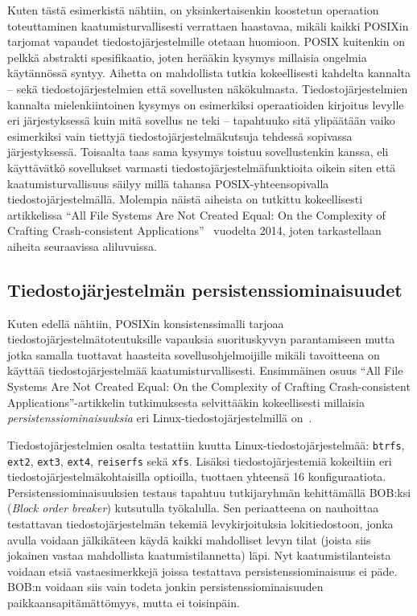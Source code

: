 Kuten tästä esimerkistä nähtiin, on yksinkertaisenkin koostetun operaation toteuttaminen kaatumisturvallisesti verrattaen haastavaa,
mikäli kaikki POSIXin tarjomat vapaudet tiedostojärjestelmille otetaan huomioon.
POSIX kuitenkin on pelkkä abstrakti spesifikaatio, joten herääkin kysymys millaisia ongelmia käytännössä syntyy.
Aihetta on mahdollista tutkia kokeellisesti kahdelta kannalta -- sekä tiedostojärjestelmien että sovellusten näkökulmasta.
Tiedostojärjestelmien kannalta mielenkiintoinen kysymys on esimerkiksi operaatioiden kirjoitus levylle eri järjestyksessä kuin mitä sovellus ne teki --
tapahtuuko sitä ylipäätään vaiko esimerkiksi vain tiettyjä tiedostojärjestelmäkutsuja tehdessä sopivassa järjestyksessä.
Toisaalta taas sama kysymys toistuu sovellustenkin kanssa, eli käyttävätkö sovellukset varmasti tiedostojärjestelmäfunktioita oikein siten
että kaatumisturvallisuus säilyy millä tahansa POSIX-yhteensopivalla tiedostojärjestelmällä.
Molempia näistä aiheista on tutkittu kokeellisesti artikkelissa ``All File Systems Are Not Created Equal: On the Complexity of Crafting Crash-consistent Applications''~\cite{PosixDataConsistency} vuodelta 2014,
joten tarkastellaan aiheita seuraavissa aliluvuissa.

\subsection{Tiedostojärjestelmän persistenssiominaisuudet}
Kuten edellä nähtiin, POSIXin konsistenssimalli tarjoaa tiedostojärjestelmätoteutuksille vapauksia suorituskyvyn parantamiseen
mutta jotka samalla tuottavat haasteita sovellusohjelmoijille mikäli tavoitteena on käyttää tiedostojärjestelmää kaatumisturvallisesti.
Ensimmäinen osuus ``All File Systems Are Not Created Equal: On the Complexity of Crafting Crash-consistent Applications''-artikkelin tutkimuksesta
selvittääkin kokeellisesti millaisia \emph{persistenssiominaisuuksia} eri Linux-tiedostojärjestelmillä on~\cite{PosixDataConsistency}.

Tiedostojärjestelmien osalta testattiin kuutta Linux-tiedostojärjestelmää: \texttt{btrfs}, \texttt{ext2}, \texttt{ext3}, \texttt{ext4}, \texttt{reiserfs} sekä \texttt{xfs}.
Lisäksi tiedostojärjestemiä kokeiltiin eri tiedostojärjestelmäkohtaisilla optioilla,
tuottaen yhteensä 16 konfiguraatiota.
Persistenssiominaisuuksien testaus tapahtuu tutkijaryhmän kehittämällä BOB:ksi (\emph{Block order breaker}) kutsutulla työkalulla.
Sen periaatteena on nauhoittaa testattavan tiedostojärjestelmän tekemiä levykirjoituksia lokitiedostoon,
jonka avulla voidaan jälkikäteen käydä kaikki mahdolliset levyn tilat (joista siis jokainen vastaa mahdollista kaatumistilannetta) läpi.
Nyt kaatumistilanteista voidaan etsiä vastaesimerkkejä joissa testattava persistenssiominaisuus ei päde.
BOB:n voidaan siis vain todeta jonkin persistenssiominaisuuden paikkaansapitämättömyys, mutta ei toisinpäin.

